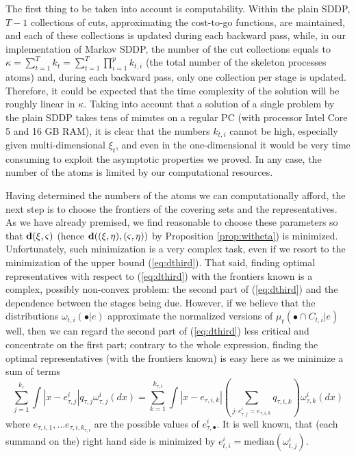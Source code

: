 \documentclass{article}              %
\begin{document}
The first thing to be taken into account is computability. Within the plain SDDP, $T-1$ collections of cuts, approximating
the cost-to-go functions, are maintained, and each of these collections
is updated during each backward pass, while, in our implementation of Markov SDDP, the number
of the cut collections equals to $\kappa=\sum_{t=1}^{T}k_{t}=\sum_{t=1}^{T}\prod_{i=1}^{p}k_{t,i}$
(the total number of the skeleton processes atoms) and, during each
backward pass, only one collection per stage is updated. Therefore,
it could be expected that the time complexity of the solution will
be roughly linear in $\kappa$. Taking into account that a solution of a single problem by the plain
SDDP takes tens of minutes on a regular PC (with processor Intel Core 5 and 16 GB RAM), it is clear that the numbers $k_{t,i}$ cannot be
high, especially given multi-dimensional $\xi_{t}$, and even
in the one-dimensional it would be very time consuming to exploit the
asymptotic properties we proved. In any case, the number of the atoms
is limited by our computational resources.

Having determined the numbers of the atoms we can computationally afford, the next step is to choose the
frontiers of the covering sets and the representatives. As we have
already premised, we find reasonable to choose these parameters so
that $\mathbf{d}(\xi,\varsigma)$ (hence $\mathbf{d}((\xi,\eta),(\varsigma,\eta))$
by Proposition \ref{prop:witheta}) is minimized. 
Unfortunately, such minimization is a very complex task, even if we resort to the minimization of the upper bound (\ref{eq:dthird}).
That said, finding optimal representatives with respect to (\ref{eq:dthird})
with the frontiers known is a complex, possibly non-convex problem:
the second part of (\ref{eq:dthird}) and the dependence between
the stages being due. However, if we believe that the distributions
$\omega_{t,i}(\bullet|e)$ approximate the normalized versions of
$\mu_{t}(\bullet\cap C_{t,i}|e)$ well, then we can regard the second part of (\ref{eq:dthird}) less critical and concentrate on the
first part; contrary to the whole expression, finding the optimal
representatives (with the frontiers known) is easy here as we minimize a sum of terms 
$$
\sum_{j=1}^{k_{\tau}}\int|x-e_{\tau,j}^{i}|q_{\tau,j}\omega^i_{\tau,j}(dx)
=
\sum_{k=1}^{k_{\tau,i}} \int|x-e_{\tau,i,k}| \left(\sum_{j:e^i_{\tau,j}=e_{\tau,i,k}} q_{\tau,i,k} \right)
\omega^i_{\tau,k} (dx)
$$
where $e_{\tau,i,1},\dots e_{\tau,i,k_{\tau,i}}$ are the possible values of $e^i_{\tau,\bullet}$. It is well known, that (each summand on the) right hand side is minimized by $e_{t,i}^{i}=\mathrm{median}(\omega^i_{t,j})$.
\end{document}

